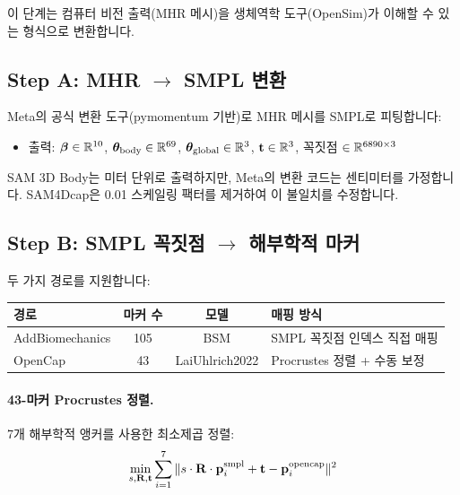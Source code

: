 \documentclass[11pt, a4paper]{report}
\begin{document}
이 단계는 컴퓨터 비전 출력(MHR 메시)을 생체역학 도구(OpenSim)가 이해할 수 있는 형식으로 변환합니다.

\subsection{Step A: MHR $\to$ SMPL 변환}

Meta의 공식 변환 도구(pymomentum 기반)로 MHR 메시를 SMPL로 피팅합니다:

\begin{itemize}[leftmargin=*]
  \item 출력: $\bm{\beta} \in \mathbb{R}^{10}$, $\bm{\theta}_{\text{body}} \in \mathbb{R}^{69}$, $\bm{\theta}_{\text{global}} \in \mathbb{R}^{3}$, $\mathbf{t} \in \mathbb{R}^{3}$, 꼭짓점 $\in \mathbb{R}^{6890 \times 3}$
\end{itemize}

\begin{warningbox}
SAM 3D Body는 미터 단위로 출력하지만, Meta의 변환 코드는 센티미터를 가정합니다. SAM4Dcap은 0.01 스케일링 팩터를 제거하여 이 불일치를 수정합니다.
\end{warningbox}

\subsection{Step B: SMPL 꼭짓점 $\to$ 해부학적 마커}

두 가지 경로를 지원합니다:

\begin{center}
\renewcommand{\arraystretch}{1.2}
\begin{tabular}{lccl}
\toprule
\textbf{경로} & \textbf{마커 수} & \textbf{모델} & \textbf{매핑 방식} \\
\midrule
AddBiomechanics & 105 & BSM & SMPL 꼭짓점 인덱스 직접 매핑 \\
OpenCap & 43 & LaiUhlrich2022 & Procrustes 정렬 + 수동 보정 \\
\bottomrule
\end{tabular}
\end{center}

\paragraph{43-마커 Procrustes 정렬.}
7개 해부학적 앵커를 사용한 최소제곱 정렬:
\begin{equation}
\min_{s, \mathbf{R}, \mathbf{t}} \sum_{i=1}^{7} \| s \cdot \mathbf{R} \cdot \mathbf{p}_i^{\text{smpl}} + \mathbf{t} - \mathbf{p}_i^{\text{opencap}} \|^2
\end{equation}
\end{document}
